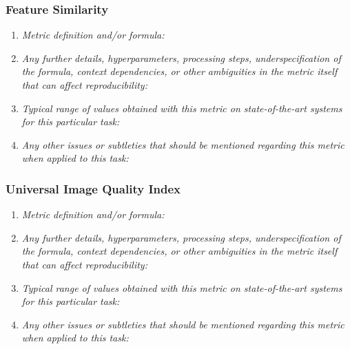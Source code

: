\documentclass[a4paper,11pt]{article}
\begin{document}
        \subsubsection{Feature Similarity}
            \begin{enumerate}[label=\alph*.]
                \item \textit{Metric definition and/or formula:}
                \bigskip
                \item \textit{Any further details, hyperparameters, processing steps, underspecification of the formula, context dependencies, or other ambiguities in the metric itself that can affect reproducibility:}
                \bigskip
                \item \textit{Typical range of values obtained with this metric on state-of-the-art systems for this particular task:}
                \bigskip
                \item \textit{Any other issues or subtleties that should be mentioned regarding this metric when applied to this task:}
                \bigskip
            \end{enumerate}
        \subsubsection{Universal Image Quality Index}
            \begin{enumerate}[label=\alph*.]
                \item \textit{Metric definition and/or formula:}
                \bigskip
                \item \textit{Any further details, hyperparameters, processing steps, underspecification of the formula, context dependencies, or other ambiguities in the metric itself that can affect reproducibility:}
                \bigskip
                \item \textit{Typical range of values obtained with this metric on state-of-the-art systems for this particular task:}
                \bigskip
                \item \textit{Any other issues or subtleties that should be mentioned regarding this metric when applied to this task:}
                \bigskip
            \end{enumerate}
\end{document}
